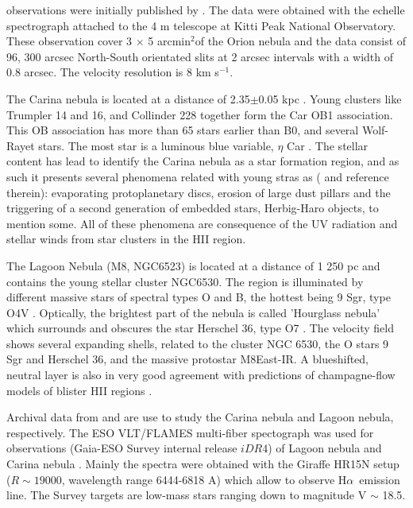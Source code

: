 \documentclass[fleqn,usenatbib, useAMS, a4paper]{mnras}
\newcommand\halpha{H${\alpha}$}
\begin{document}
\citet{arthur2016turbulence} observations were initially published by \citet{2008RMxAA..44..181G}. The data were obtained with the echelle spectrograph attached to the 4 m telescope at Kitti Peak National Observatory. These observation cover 3 \(\times\) 5 arcmin\(^{2}\)of the Orion nebula and the data consist of 96, 300 arcsec North-South orientated slits at 2 arcsec intervals with a width of 0.8 arcsec. The velocity resolution is 8 km s\(^{-1}\).

The Carina nebula is located at a distance of 2.35$\pm$0.05 kpc \citep{2006ApJ...644.1151S}.
Young clusters like Trumpler 14 and 16, and Collinder 228 together form the Car OB1 association.
This OB association has more than 65 stars earlier than B0, and several Wolf-Rayet stars.
The most star is a luminous blue variable, $\eta$ Car \citep{Damiani:2016a}.
The stellar content has lead to identify the Carina nebula as a star formation region, and as such it presents several phenomena related with young stras as (\citet{2006ApJ...644.1151S} and reference therein): evaporating protoplanetary discs, erosion of large dust pillars and the triggering of a second generation of embedded stars, Herbig-Haro objects, to mention some. 
All of these phenomena are consequence of the UV radiation and stellar winds from star clusters in the HII region.

The Lagoon Nebula (M8, NGC6523) is located at a distance of 1 250 pc \citep{2005A&A...430..941P} and contains the young stellar cluster NGC6530.
The region is illuminated by different massive stars of spectral types O and B, the hottest being 9 Sgr, type O4V \citep{Damiani:2017b}.
Optically, the brightest part of the nebula is called 'Hourglass nebula' which surrounds and obscures the star Herschel 36, type O7 \citep{1986AJ.....91..870W}. 
The velocity field shows several expanding shells, related to the cluster NGC 6530, the O stars 9 Sgr and Herschel 36, and the massive protostar M8East-IR. A blueshifted, neutral layer is also in very good agreement with predictions of champagne-flow models of blister HII regions \citep{Damiani:2017b}.

Archival data from \citet{Damiani:2016a} and \citet{Damiani:2017b} are use to study the Carina nebula and Lagoon nebula, respectively. 
The ESO VLT/FLAMES multi-fiber spectograph was used for observations (Gaia-ESO Survey internal release \(iDR4\)) of Lagoon nebula  and Carina nebula \citep{2002Msngr.110....1P}. 
Mainly the spectra were obtained with the Giraffe HR15N setup (\(R \sim19 000\), wavelength range 6444-6818 A) which allow to observe \halpha\ emission line. 
The Survey targets are low-mass stars ranging down to magnitude V \(\sim\) 18.5.
\end{document}
